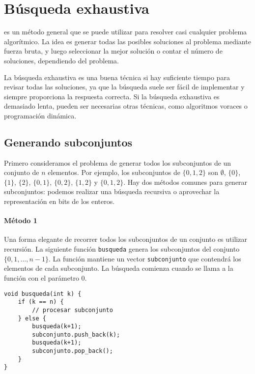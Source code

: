 \chapter{Búsqueda exhaustiva}

es un método general que se puede utilizar
para resolver casi cualquier problema algorítmico.
La idea es generar todas las posibles
soluciones al problema mediante fuerza bruta,
y luego seleccionar la mejor solución o contar el
número de soluciones, dependiendo del problema.

La búsqueda exhaustiva es una buena técnica
si hay suficiente tiempo para revisar todas las soluciones,
ya que la búsqueda suele ser fácil de implementar
y siempre proporciona la respuesta correcta.
Si la búsqueda exhaustiva es demasiado lenta,
pueden ser necesarias otras técnicas, como algoritmos voraces o
programación dinámica.

\section{Generando subconjuntos}


Primero consideramos el problema de generar
todos los subconjuntos de un conjunto de $n$ elementos.
Por ejemplo, los subconjuntos de $\{0,1,2\}$ son
$\emptyset$, $\{0\}$, $\{1\}$, $\{2\}$, $\{0,1\}$,
$\{0,2\}$, $\{1,2\}$ y $\{0,1,2\}$.
Hay dos métodos comunes para generar subconjuntos:
podemos realizar una búsqueda recursiva
o aprovechar la representación en bits de los enteros.

\subsubsection{Método 1}

Una forma elegante de recorrer todos los subconjuntos
de un conjunto es utilizar recursión.
La siguiente función \texttt{busqueda}
genera los subconjuntos del conjunto
$\{0,1,\ldots,n-1\}$.
La función mantiene un vector \texttt{subconjunto}
que contendrá los elementos de cada subconjunto.
La búsqueda comienza cuando se llama
a la función con el parámetro 0.

\begin{lstlisting}
void busqueda(int k) {
    if (k == n) {
        // procesar subconjunto
    } else {
        busqueda(k+1);
        subconjunto.push_back(k);
        busqueda(k+1);
        subconjunto.pop_back();
    }
}
\end{lstlisting}

